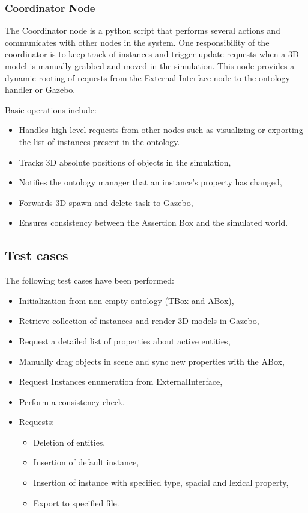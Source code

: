 \subsubsection{Coordinator Node}
The Coordinator node is a python script that performs several actions and communicates with other nodes in the system. One responsibility of the coordinator is to keep track of instances and trigger update requests when a 3D model is manually grabbed and moved in the simulation. This node provides a dynamic rooting of requests from the External Interface node to the ontology handler or Gazebo. 

Basic operations include:

\begin{itemize}
\item Handles high level requests from other nodes such as visualizing or exporting the  list of instances present in the ontology.
\item Tracks 3D absolute positions of objects in the simulation,
\item Notifies the ontology manager that an instance's property has changed,
\item Forwards 3D spawn and delete task to Gazebo,
\item Ensures consistency between the Assertion Box and the simulated world.
\end{itemize}

\subsection{Test cases}

The following test cases have been performed:

\begin{itemize}
\item Initialization from non empty ontology (TBox and ABox),
\item Retrieve collection of instances and render 3D models in Gazebo,
\item Request a detailed list of properties about active entities,
\item Manually drag objects in scene and sync new properties with the ABox,
\item Request Instances enumeration from ExternalInterface,
\item Perform a consistency check.
\item Requests:
	\begin{itemize}
		\item Deletion of entities,
		\item Insertion of default instance,
		\item Insertion of instance with specified type, spacial and lexical property,
		\item Export to specified file.
	\end{itemize}
\end{itemize}